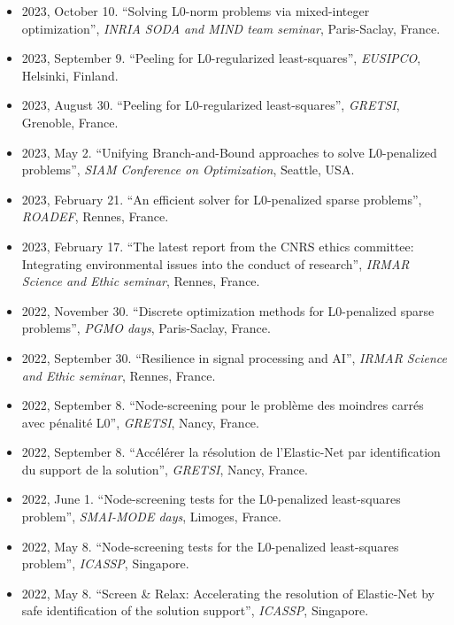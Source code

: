 \begin{itemize}
    \item 2023, October 10. ``Solving L0-norm problems via mixed-integer optimization'', \textit{INRIA SODA and MIND team seminar}, Paris-Saclay, France.
    \item 2023, September 9. ``Peeling for L0-regularized least-squares'', \textit{EUSIPCO}, Helsinki, Finland.
    \item 2023, August 30. ``Peeling for L0-regularized least-squares'', \textit{GRETSI}, Grenoble, France.
    \item 2023, May 2. ``Unifying Branch-and-Bound approaches to solve L0-penalized problems'', \textit{SIAM Conference on Optimization}, Seattle, USA.
    \item 2023, February 21. ``An efficient solver for L0-penalized sparse problems'', \textit{ROADEF}, Rennes, France.
    \item 2023, February 17. ``The latest report from the CNRS ethics committee: Integrating environmental issues into the conduct of research'', \textit{IRMAR Science and Ethic seminar}, Rennes, France.
    \item 2022, November 30. ``Discrete optimization methods for L0-penalized sparse problems'', \textit{PGMO days}, Paris-Saclay, France.
    \item 2022, September 30. ``Resilience in signal processing and AI'', \textit{IRMAR Science and Ethic seminar}, Rennes, France.
    \item 2022, September 8. ``Node-screening pour le problème des moindres carrés avec pénalité L0'', \textit{GRETSI}, Nancy, France.
    \item 2022, September 8. ``Accélérer la résolution de l’Elastic-Net par identification du support de la solution'', \textit{GRETSI}, Nancy, France.
    \item 2022, June 1. ``Node-screening tests for the L0-penalized least-squares problem'', \textit{SMAI-MODE days}, Limoges, France.
    \item 2022, May 8. ``Node-screening tests for the L0-penalized least-squares problem'', \textit{ICASSP}, Singapore.
    \item 2022, May 8. ``Screen \& Relax: Accelerating the resolution of Elastic-Net by safe identification of the solution support'', \textit{ICASSP}, Singapore.
\end{itemize}